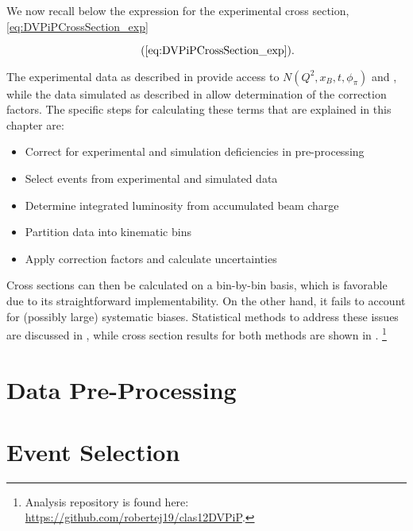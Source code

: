 We now recall below the expression for the experimental cross section, \eqref{eq:DVPiPCrossSection_exp}

        \begin{equation*}
          \recallLabel{eq:DVPiPCrossSection_exp}.
        \end{equation*}

The experimental data as described in  provide access to $N(Q^2,x_B,t,\phi_{\pi})$ and \Lumiint, while the data simulated as described in  allow determination of the correction factors. The specific steps for calculating these terms that are explained in this chapter are: 


\begin{itemize}
  \item Correct for experimental and simulation deficiencies in pre-processing 
  \item Select \dvpip events from experimental and simulated data 
  \item Determine integrated luminosity from accumulated beam charge 
  \item Partition data into kinematic bins 
  \item Apply correction factors and calculate uncertainties 
\end{itemize}

Cross sections can then be calculated on a bin-by-bin basis, which is favorable due to its straightforward implementability. On the other hand, it fails to account for (possibly large) systematic biases. Statistical methods to address these issues are discussed in , while cross section results for both methods are shown in . \footnote{Analysis repository is found here:  \href{https://github.com/robertej19/clas12DVPiP}{https://github.com/robertej19/clas12DVPiP}.}

\section{Data Pre-Processing}\label{sec:Ch4_data_preprocess}
    
    \clearpage
    
\section{Event Selection}\label{sec:Ch4_event_selection}
    
    \clearpage
    
